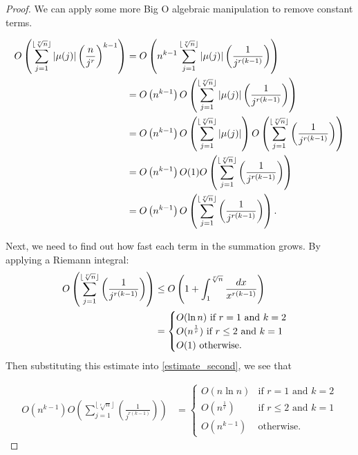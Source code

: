 \documentclass[10pt,a4paper]{article}
\theoremstyle{definition}
\theoremstyle{remark}
\begin{document}
\begin{proof}
	We can apply some more Big O algebraic manipulation to remove constant terms.
	
	\begin{align}
	O\left(\sum_{j=1}^{\lfloor\sqrt[r]{n}\rfloor}|\mu(j)|\left(\frac{n}{j^r}\right)^{k-1}\right) 
	& = O\left(n^{k-1}\sum_{j=1}^{\lfloor\sqrt[r]{n}\rfloor}|\mu(j)|\left(\frac{1}{j^{r(k-1)}}\right)\right) \notag\\
	& = O\left(n^{k-1}\right)O\left(\sum_{j=1}^{\lfloor\sqrt[r]{n}\rfloor}|\mu(j)|\left(\frac{1}{j^{r(k-1)}}\right)\right)\notag\\
	& = O\left(n^{k-1}\right)O\left(\sum_{j=1}^{\lfloor\sqrt[r]{n}\rfloor}|\mu(j)|\right)O\left(\sum_{j=1}^{\lfloor\sqrt[r]{n}\rfloor}\left(\frac{1}{j^{r(k-1)}}\right)\right)\notag\\
	& =O\left(n^{k-1}\right)O(1)O\left(\sum_{j=1}^{\lfloor\sqrt[r]{n}\rfloor}\left(\frac{1}{j^{r(k-1)}}\right)\right)\notag\\
	&=O\left(n^{k-1}\right)O\left(\sum_{j=1}^{\lfloor\sqrt[r]{n}\rfloor}\left(\frac{1}{j^{r(k-1)}}\right)\right). \label{estimate_second}
	\end{align}

	Next, we need to find out how fast each term in the summation grows.
	By applying a Riemann integral:
	\begin{align}
		O\left(\sum_{j=1}^{\lfloor\sqrt[r]{n}\rfloor}\left(\frac{1}{j^{r(k-1)}}\right)\right)&\leq O\left(1+\int_{1}^{\sqrt[r]{n}}\frac{dx}{x^{r(k-1)}}\right) \notag \\
		&= \begin{cases}
			O(\ln n) \text{ if } r=1 \text{ and } k=2\\
			O(n^{\frac{1}{r}}) \text{ if } r\leq 2 \text{ and } k=1\\
			O(1) \text{ otherwise.}
		\end{cases}
	\end{align} 
	Then substituting this estimate into \cref{estimate_second}, we see that 
	
	\begin{align}
	O\left(n^{k-1}\right)O\left(\sum_{j=1}^{\lfloor\sqrt[r]{n}\rfloor}\left(\frac{1}{j^{r(k-1)}}\right)\right) &= \begin{cases}
	O(n\ln n) & \text{if } r=1 \text{ and } k=2\\
	O(n^{\frac{1}{r}}) & \text{if } r\leq 2 \text{ and } k=1\\
	O(n^{k-1}) & \text{otherwise.}
	\end{cases}
	\end{align}


\end{proof}
\end{document}
